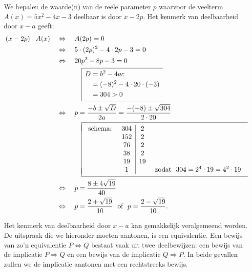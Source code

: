 \documentclass{ximera}
\begin{document}
\begin{example} 
We bepalen de waarde(n) van de re\"ele parameter $p$ waarvoor de veelterm $A(x) = 5x^2-4x-3$ deelbaar is door $x-2p$. Het kenmerk van deelbaarheid door $x-a$ geeft:
\begin{align*}
(x-2p) \mid A(x) \quad 
& \Leftrightarrow \quad A(2p) = 0 \\
& \Leftrightarrow \quad 5 \cdot (2p)^2 - 4 \cdot 2p - 3 = 0 \\
& \Leftrightarrow \quad 20p^2 - 8p - 3 = 0 \\
& \mph{\Leftrightarrow} \qquad 
\begin{array}{|l}
\hline
\begin{aligned}
\vrule height 0.4cm width 0cm
D & = b^2-4ac \\[0.1cm]
& = (-8)^2-4 \cdot 20 \cdot (-3) \\[0.1cm]
& = 304 > 0 \\[0.1cm]
\end{aligned} \\
\hline
\end{array} \\
& \Leftrightarrow \quad p = \frac{-b \pm \sqrt{D}}{2a} = \frac{-(-8) \pm \sqrt{304}}{2 \cdot 20} \\
& \mph{\Leftrightarrow} \qquad 
\begin{array}{|l}
\hline
\mbox{} \\[-0.3cm]
\begin{array}{lc|cr}
\text{schema: } & 304 & 2 \\
& 152 & 2 \\
& 76 & 2 \\
& 38 & 2 \\
& 19 & 19 \\
& 1 & & \text{ zodat } \,\, 304 = 2^4 \cdot 19 = 4^2 \cdot 19
\end{array}\\[-0.3cm]
\mbox{} \\
\hline
\end{array} \\
& \Leftrightarrow \quad p = \frac{8 \pm 4\sqrt{19}}{40} \\
& \Leftrightarrow \quad p = \frac{2 + \sqrt{19}}{10} \,\, \text{ of } \,\, p = \frac{2 - \sqrt{19}}{10}.
\end{align*}
\end{example} 

Het kenmerk van deelbaarheid door $x-a$ kan gemakkelijk veralgemeend worden. De uitspraak die we hieronder moeten aantonen, is een equivalentie. Een bewijs van zo'n equivalentie $P \Leftrightarrow Q$ bestaat vaak uit twee deelbewijzen: een bewijs van de implicatie $P \Rightarrow Q$ en een bewijs van de implicatie $Q \Rightarrow P$. In beide gevallen zullen we de implicatie aantonen met een rechtstreeks bewijs.
\end{document}

